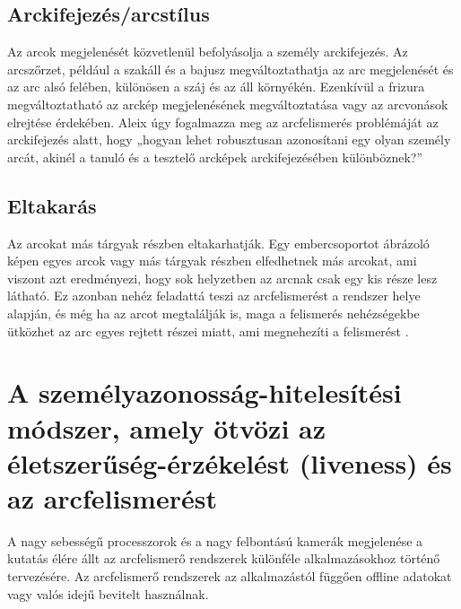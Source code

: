 \subsection{Arckifejezés/arcstílus}

Az arcok megjelenését közvetlenül befolyásolja a személy arckifejezés. Az arcszőrzet, például a szakáll és a bajusz megváltoztathatja az arc megjelenését és az arc alsó felében, különösen a száj és az áll környékén. Ezenkívül a frizura megváltoztatható az arckép megjelenésének megváltoztatása vagy az arcvonások elrejtése érdekében. Aleix \cite{16} úgy fogalmazza meg az arcfelismerés problémáját az arckifejezés alatt, hogy „hogyan lehet robusztusan azonosítani egy olyan személy arcát, akinél a tanuló és a tesztelő arcképek arckifejezésében különböznek?”


\subsection{Eltakarás}

Az arcokat más tárgyak részben eltakarhatják. Egy embercsoportot ábrázoló képen egyes arcok vagy más tárgyak részben elfedhetnek más arcokat, ami viszont azt eredményezi, hogy sok helyzetben az arcnak csak egy kis része lesz látható. Ez azonban nehéz feladattá teszi az arcfelismerést a rendszer helye alapján, és még ha az arcot megtalálják is, maga a felismerés nehézségekbe ütközhet az arc egyes rejtett részei miatt, ami megnehezíti a felismerést \cite{17}.


\section{A személyazonosság-hitelesítési módszer, amely ötvözi az életszerűség-érzékelést (liveness) és az arcfelismerést}

A nagy sebességű processzorok és a nagy felbontású kamerák megjelenése a kutatás élére állt az arcfelismerő rendszerek különféle alkalmazásokhoz történő tervezésére. Az arcfelismerő rendszerek az alkalmazástól függően offline adatokat vagy valós idejű bevitelt használnak.


